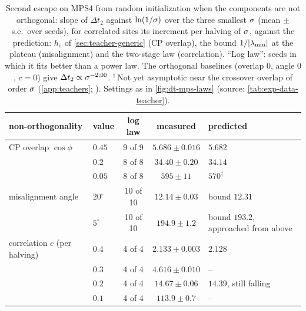 \begin{table}[t]
  \centering
  \caption{Second escape on MPS4 from random initialization when the components are not orthogonal:
    slope of $\Delta t_2$ against $\ln(1/\sigma)$ over the three smallest $\sigma$ (mean $\pm$ s.e.\ over seeds), for
    correlated sites its increment per halving of $\sigma$, against the prediction: $h_e$ of
    \cref{sec:teacher-generic} (CP overlap), the bound $1/\lvert\lambda_{\min}\rvert$ at the plateau (misalignment) and
    the two-stage law (correlation). ``Log law'': seeds in which it fits better than a power law. The
    orthogonal baselines (overlap $0$, angle $0$, $c=0$) give $\Delta t_2\propto\sigma^{-2.00}$. $^\dagger$\,Not yet
    asymptotic near the crossover overlap of order $\sigma$ (\cref{app:teachers}; \conjecture). Settings as in
    \cref{fig:dt-mps-laws} (source: \cref{tab:exp-data-teacher}).}
  \label{tab:cov-slopes}
  \footnotesize
  \begin{tabular}{@{}llccl@{}}
    \toprule
    non-orthogonality & value & log law & measured & predicted \\
    \midrule
    CP overlap $\cos\phi$ & $0.45$       & 9 of 9   & $5.686\pm0.016$ & $5.682$ \\
                          & $0.2$        & 8 of 8   & $34.40\pm0.20$  & $34.14$ \\
                          & $0.05$       & 8 of 8   & $595\pm11$      & $570^\dagger$ \\
    misalignment angle    & $20^\circ$   & 10 of 10 & $12.14\pm0.03$  & bound $12.31$ \\
                          & $5^\circ$    & 10 of 10 & $194.9\pm1.2$   & bound $193.2$, approached from above \\
    correlation $c$ (per halving) & $0.4$ & 4 of 4 & $2.133\pm0.003$ & $2.128$ \\
                          & $0.3$        & 4 of 4   & $4.616\pm0.010$ & -- \\
                          & $0.2$        & 4 of 4   & $14.67\pm0.06$  & $14.39$, still falling \\
                          & $0.1$        & 4 of 4   & $113.9\pm0.7$   & -- \\
    \bottomrule
  \end{tabular}
\end{table}

